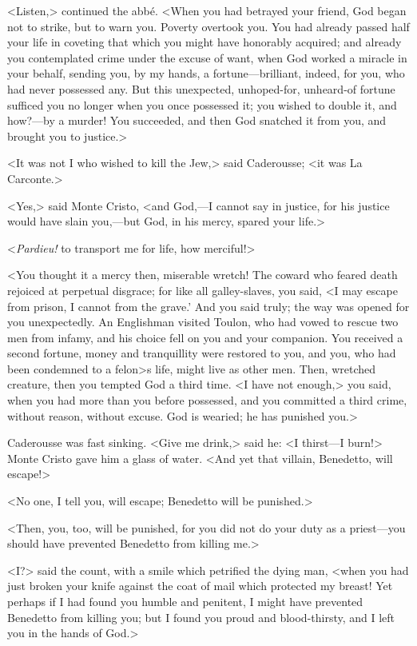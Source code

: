  <Listen,> continued the abbé. <When you had betrayed your friend, God began not to strike, but to warn you. Poverty overtook you. You had already passed half your life in coveting that which you might have honorably acquired; and already you contemplated crime under the excuse of want, when God worked a miracle in your behalf, sending you, by my hands, a fortune—brilliant, indeed, for you, who had never possessed any. But this unexpected, unhoped-for, unheard-of fortune sufficed you no longer when you once possessed it; you wished to double it, and how?—by a murder! You succeeded, and then God snatched it from you, and brought you to justice.> 

 <It was not I who wished to kill the Jew,> said Caderousse; <it was La Carconte.> 

 <Yes,> said Monte Cristo, <and God,—I cannot say in justice, for his justice would have slain you,—but God, in his mercy, spared your life.> 

 <\textit{Pardieu!} to transport me for life, how merciful!> 

 <You thought it a mercy then, miserable wretch! The coward who feared death rejoiced at perpetual disgrace; for like all galley-slaves, you said, <I may escape from prison, I cannot from the grave.' And you said truly; the way was opened for you unexpectedly. An Englishman visited Toulon, who had vowed to rescue two men from infamy, and his choice fell on you and your companion. You received a second fortune, money and tranquillity were restored to you, and you, who had been condemned to a felon>s life, might live as other men. Then, wretched creature, then you tempted God a third time. <I have not enough,> you said, when you had more than you before possessed, and you committed a third crime, without reason, without excuse. God is wearied; he has punished you.> 

 Caderousse was fast sinking. <Give me drink,> said he: <I thirst—I burn!> Monte Cristo gave him a glass of water. <And yet that villain, Benedetto, will escape!> 

 <No one, I tell you, will escape; Benedetto will be punished.> 

 <Then, you, too, will be punished, for you did not do your duty as a priest—you should have prevented Benedetto from killing me.> 

 <I?> said the count, with a smile which petrified the dying man, <when you had just broken your knife against the coat of mail which protected my breast! Yet perhaps if I had found you humble and penitent, I might have prevented Benedetto from killing you; but I found you proud and blood-thirsty, and I left you in the hands of God.> 

